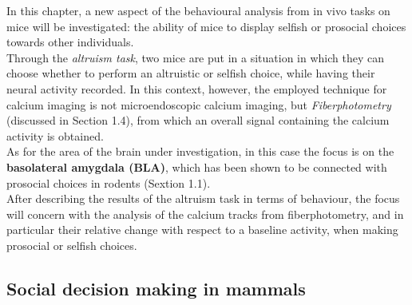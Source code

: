 \documentclass[a4paper]{article}
\begin{document}
In this chapter, a new aspect of the behavioural analysis from in vivo tasks on mice will be investigated: the ability of mice to display selfish or prosocial choices towards other individuals.\\
Through the \textit{altruism task}, two mice are put in a situation in which they can choose whether to perform an altruistic or selfish choice, while having their neural activity recorded. In this context, however, the employed technique for calcium imaging is not microendoscopic calcium imaging, but \textit{Fiberphotometry} (discussed in Section 1.4), from which an overall signal containing the calcium activity is obtained.\\
As for the area of the brain under investigation, in this case the focus is on the \textbf{basolateral amygdala (BLA)}, which has been shown to be connected with prosocial choices in rodents (Sextion 1.1).\\
After describing the results of the altruism task in terms of behaviour, the focus will concern with the analysis of the calcium tracks from fiberphotometry, and in particular their relative change with respect to a baseline activity, when making prosocial or selfish choices.


\subsection{Social decision making in mammals}
\end{document}
